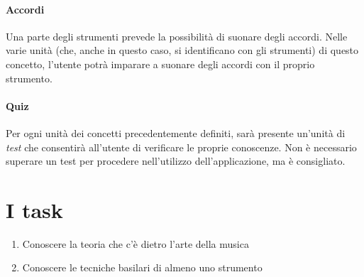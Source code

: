 \paragraph{Accordi} Una parte degli strumenti prevede la possibilità di suonare degli accordi. Nelle varie unità (che, anche in questo caso, si identificano con gli strumenti) di questo concetto, l'utente potrà imparare a suonare degli accordi con il proprio strumento.
\paragraph{Quiz} Per ogni unità dei concetti precedentemente definiti, sarà presente un'unità di \textit{test} che consentirà all'utente di verificare le proprie conoscenze. Non è necessario superare un test per procedere nell'utilizzo dell'applicazione, ma è consigliato.
\section{I task}
\begin{enumerate}
	\item Conoscere la teoria che c'è dietro l'arte della musica
	\item Conoscere le tecniche basilari di almeno uno strumento
\end{enumerate}
